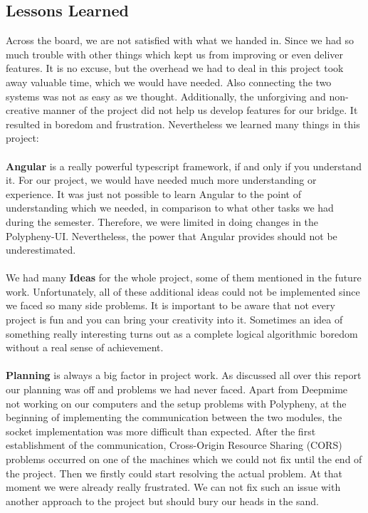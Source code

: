 \subsection{Lessons Learned}
Across the board, we are not satisfied with what we handed in. Since we had so much trouble with other things which kept us from improving or even deliver features. It is no excuse, but the overhead we had to deal in this project took away valuable time, which we would have needed. Also connecting the two systems was not as easy as we thought. Additionally, the unforgiving and non-creative manner of the project did not help us develop features for our bridge. It resulted in boredom and frustration. Nevertheless we learned many things in this project:
\\
\\
\textbf{Angular} is a really powerful typescript framework, if and only if you understand it. For our project, we would have needed much more understanding or experience. It was just not possible to learn Angular to the point of understanding which we needed, in comparison to what other tasks we had during the semester. Therefore, we were limited in doing changes in the Polypheny-UI. Nevertheless, the power that Angular provides should not be underestimated.
\\
\\
We had many \textbf{Ideas} for the whole project, some of them mentioned in the future work. Unfortunately, all of these additional ideas could not be implemented since we faced so many side problems. It is important to be aware that not every project is fun and you can bring your creativity into it. Sometimes an idea of something really interesting turns out as a complete logical algorithmic boredom without a real sense of achievement.
\\
\\
\textbf{Planning} is always a big factor in project work. As discussed all over this report our planning was off and problems we had never faced. Apart from Deepmime not working on our computers and the setup problems with Polypheny, at the beginning of implementing the communication between the two modules, the socket implementation was more difficult than expected. After the first establishment of the communication, Cross-Origin Resource Sharing (CORS) problems occurred on one of the machines which we could not fix until the end of the project. Then we firstly could start resolving the actual problem. At that moment we were already really frustrated. We can not fix such an issue with another approach to the project but should bury our heads in the sand.
